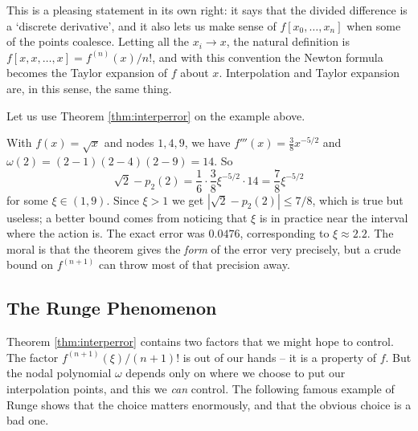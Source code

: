 \documentclass[a4paper]{scrartcl}
\providecommand{\abs}[1]{\left\lvert#1\right\rvert}
\renewcommand{\abs}[1]{\left\lvert#1\right\rvert}
\begin{document}
\begin{remark}
  This is a pleasing statement in its own right: it says that the divided difference is a `discrete derivative', and it also lets us make sense of $f[x_0, \dots, x_n]$ when some of the points coalesce. Letting all the $x_i \to x$, the natural definition is $f[x, x, \dots, x] = f^{(n)}(x)/n!$, and with this convention the Newton formula becomes the Taylor expansion of $f$ about $x$. Interpolation and Taylor expansion are, in this sense, the same thing.
\end{remark}

Let us use Theorem \ref{thm:interperror} on the example above.

\begin{example}
  With $f(x) = \sqrt{x}$ and nodes $1, 4, 9$, we have $f'''(x) = \tfrac{3}{8}x^{-5/2}$ and $\omega(2) = (2-1)(2-4)(2-9) = 14$. So
  $$
  \sqrt{2} - p_2(2) = \frac{1}{6}\cdot \frac{3}{8}\xi^{-5/2}\cdot 14 = \frac{7}{8}\xi^{-5/2}
  $$
  for some $\xi \in (1,9)$. Since $\xi > 1$ we get $\abs{\sqrt 2 - p_2(2)} \le 7/8$, which is true but useless; a better bound comes from noticing that $\xi$ is in practice near the interval where the action is. The exact error was $0.0476$, corresponding to $\xi \approx 2.2$. The moral is that the theorem gives the \emph{form} of the error very precisely, but a crude bound on $f^{(n+1)}$ can throw most of that precision away.
\end{example}

\subsection{The Runge Phenomenon}

Theorem \ref{thm:interperror} contains two factors that we might hope to control. The factor $f^{(n+1)}(\xi)/(n+1)!$ is out of our hands -- it is a property of $f$. But the nodal polynomial $\omega$ depends only on where we choose to put our interpolation points, and this we \emph{can} control. The following famous example of Runge shows that the choice matters enormously, and that the obvious choice is a bad one.
\end{document}
